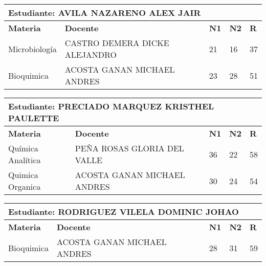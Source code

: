 \small
\begin{tabularx}{\textwidth}{|p{5cm}|p{7cm}|X|X|X|}
\hline
\multicolumn{5}{|p{\dimexpr\textwidth-2\tabcolsep-2\arrayrulewidth}|}{\textbf{Estudiante: AVILA NAZARENO ALEX JAIR }}\\\hline
\textbf{Materia} & \textbf{Docente} & \textbf{N1} & \textbf{N2} & \textbf{R} \\ \hline
Microbiología & CASTRO DEMERA DICKE ALEJANDRO  & 21 & 16& 37 \\ \hline
Bioquimica & ACOSTA GANAN MICHAEL ANDRES  & 23 & 28& 51 \\ \hline
\end{tabularx}\vspace{10mm}
\small
\begin{tabularx}{\textwidth}{|p{5cm}|p{7cm}|X|X|X|}
\hline
\multicolumn{5}{|p{\dimexpr\textwidth-2\tabcolsep-2\arrayrulewidth}|}{\textbf{Estudiante: PRECIADO MARQUEZ KRISTHEL PAULETTE }}\\\hline
\textbf{Materia} & \textbf{Docente} & \textbf{N1} & \textbf{N2} & \textbf{R} \\ \hline
Química Analítica & PEÑA ROSAS GLORIA DEL VALLE  & 36 & 22& 58 \\ \hline
Quimica Organica & ACOSTA GANAN MICHAEL ANDRES  & 30 & 24& 54 \\ \hline
\end{tabularx}\vspace{10mm}
\small
\begin{tabularx}{\textwidth}{|p{5cm}|p{7cm}|X|X|X|}
\hline
\multicolumn{5}{|p{\dimexpr\textwidth-2\tabcolsep-2\arrayrulewidth}|}{\textbf{Estudiante: RODRIGUEZ VILELA DOMINIC JOHAO }}\\\hline
\textbf{Materia} & \textbf{Docente} & \textbf{N1} & \textbf{N2} & \textbf{R} \\ \hline
Bioquimica & ACOSTA GANAN MICHAEL ANDRES  & 28 & 31& 59 \\ \hline
\end{tabularx}\vspace{10mm}
